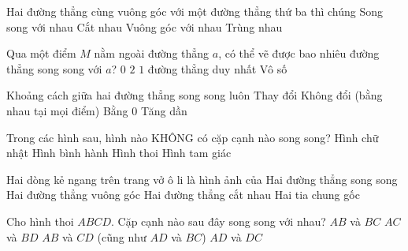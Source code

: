 \begin{ex} %
Hai đường thẳng cùng vuông góc với một đường thẳng thứ ba thì chúng
\choice
{\True Song song với nhau}
{Cắt nhau}
{Vuông góc với nhau}
{Trùng nhau}
\end{ex}

\begin{ex} %
Qua một điểm $M$ nằm ngoài đường thẳng $a$, có thể vẽ được bao nhiêu đường thẳng song song với $a$?
\choice
{$0$}
{$2$}
{\True $1$ đường thẳng duy nhất}
{Vô số}
\end{ex}

\begin{ex} %
Khoảng cách giữa hai đường thẳng song song luôn
\choice
{Thay đổi}
{\True Không đổi (bằng nhau tại mọi điểm)}
{Bằng 0}
{Tăng dần}
\end{ex}

\begin{ex} %
Trong các hình sau, hình nào KHÔNG có cặp cạnh nào song song?
\choice
{Hình chữ nhật}
{Hình bình hành}
{Hình thoi}
{\True Hình tam giác}
\end{ex}

\begin{ex} %
Hai dòng kẻ ngang trên trang vở ô li là hình ảnh của
\choice
{\True Hai đường thẳng song song}
{Hai đường thẳng vuông góc}
{Hai đường thẳng cắt nhau}
{Hai tia chung gốc}
\end{ex}

\begin{ex} %
Cho hình thoi $ABCD$. Cặp cạnh nào sau đây song song với nhau?
\choice
{$AB$ và $BC$}
{$AC$ và $BD$}
{\True $AB$ và $CD$ (cũng như $AD$ và $BC$)}
{$AD$ và $DC$}
\end{ex}

